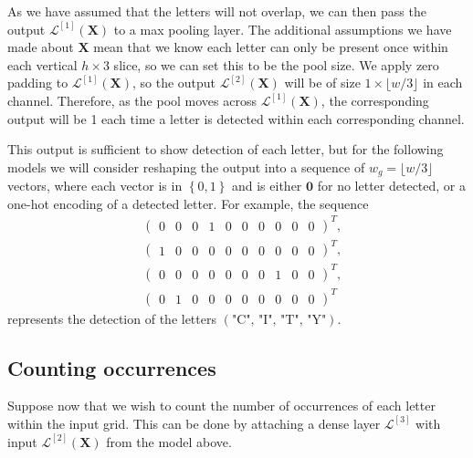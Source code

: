 \documentclass{somasmsc}
\begin{document}
As we have assumed that the letters will not overlap, we can then pass the output $\mathcal{L}^{\left[1\right]}\left(\mathbf{X}\right)$ to a max pooling layer. The additional assumptions we have made about $\mathbf{X}$ mean that we know each letter can only be present once within each vertical $h \times 3$ slice, so we can set this to be the pool size. We apply zero padding to $\mathcal{L}^{\left[1\right]}\left(\mathbf{X}\right)$, so the output $\mathcal{L}^{\left[2\right]}\left(\mathbf{X}\right)$ will be of size $1 \times \lfloor w/3 \rfloor$ in each channel. Therefore, as the pool moves across $\mathcal{L}^{\left[1\right]}\left(\mathbf{X}\right)$, the corresponding output will be 1 each time a letter is detected within each corresponding channel.

This output is sufficient to show detection of each letter, but for the following models we will consider reshaping the output into a sequence of $w_g = \lfloor w/3 \rfloor$ vectors, where each vector is in $\left\{0,1\right\}$ and is either $\mathbf{0}$ for no letter detected, or a one-hot encoding of a detected letter. For example, the sequence
\begin{align*}
    &\begin{pmatrix}
        0 & 0 & 0 & 1 & 0 & 0 & 0 & 0 & 0 & 0
    \end{pmatrix}^T, \\
    &\begin{pmatrix}
        1 & 0 & 0 & 0 & 0 & 0 & 0 & 0 & 0 & 0
    \end{pmatrix}^T, \\
    &\begin{pmatrix}
        0 & 0 & 0 & 0 & 0 & 0 & 0 & 1 & 0 & 0
    \end{pmatrix}^T, \\
    &\begin{pmatrix}
        0 & 1 & 0 & 0 & 0 & 0 & 0 & 0 & 0 & 0
    \end{pmatrix}^T
\end{align*}
represents the detection of the letters $\left(\text{"C", "I", "T", "Y"}\right)$.

\subsection{Counting occurrences}\label{letters:count}

Suppose now that we wish to count the number of occurrences of each letter within the input grid. This can be done by attaching a dense layer $\mathcal{L}^{\left[3\right]}$ with input $\mathcal{L}^{\left[2\right]}\left(\mathbf{X}\right)$ from the model above.
\end{document}

